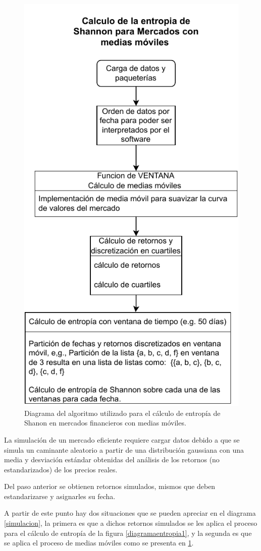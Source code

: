 \begin{figure}
	\centering
	\includegraphics[width=0.7\linewidth]{figures/entropiaMAV}
	\caption{Diagrama del algoritmo utilizado para el c\'alculo de entrop\'ia de Shanon en mercados financieros con medias m\'oviles.}
	\label{entropiamav}
\end{figure}

La simulación de un mercado eficiente requiere cargar datos debido a que se simula un caminante aleatorio a partir de una distribución gaussiana con una media y desviación estándar obtenidas del análisis de los retornos (no estandarizados) de los precios reales. 

Del paso anterior se obtienen retornos simulados, mismos que deben estandarizarse y asignarles su fecha.

A partir de este punto hay dos situaciones que se pueden apreciar en el diagrama \ref{simulacion}, la primera es que a dichos retornos simulados se les aplica el proceso para el cálculo de entropía de la figura \ref{diagramaentropia1}, y la segunda es que se aplica el proceso de medias móviles como se presenta en \ref{entropiamav}.


